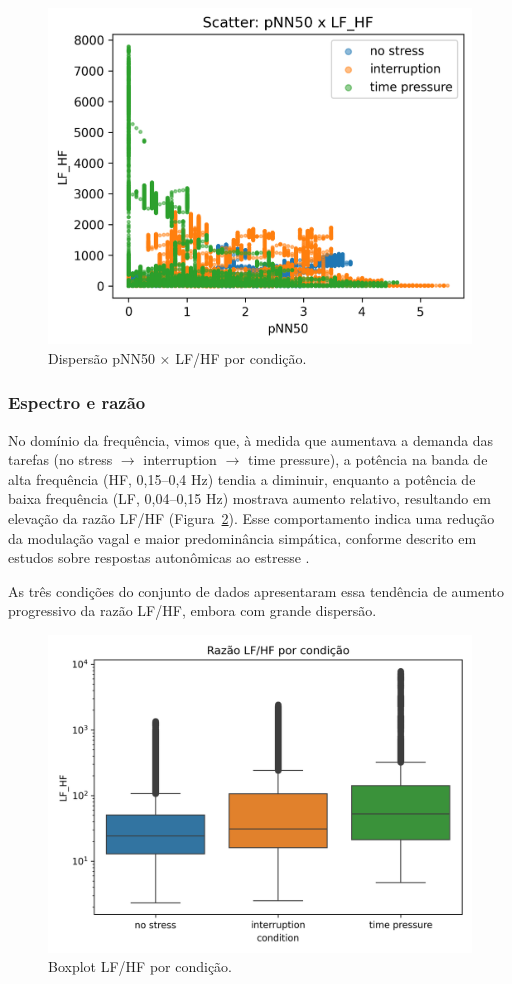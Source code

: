 \documentclass[conference]{IEEEtran}
\begin{document}
\begin{figure}[H]
    \centering
    \includegraphics[width=0.8\linewidth]{../../../images/Anderson/Scatter_Condicional/Scatter pNN50 x LF_HF.png}
    \caption{Dispersão pNN50 × LF/HF por condição.}
    \label{fig:pnn50_X_LFHF}
\end{figure}

\subsubsection{Espectro e razão}

No domínio da frequência, vimos que, à medida que aumentava a demanda das tarefas (no stress $\rightarrow$ interruption $\rightarrow$ time pressure), a potência na banda de alta frequência (HF, 0,15–0,4 Hz) tendia a diminuir, enquanto a potência de baixa frequência (LF, 0,04–0,15 Hz) mostrava aumento relativo, resultando em elevação da razão LF/HF (Figura~\ref{fig:lfhf_box}). Esse comportamento indica uma redução da modulação vagal e maior predominância simpática, conforme descrito em estudos sobre respostas autonômicas ao estresse \cite{R1}.

As três condições do conjunto de dados apresentaram essa tendência de aumento progressivo da razão LF/HF, embora com grande dispersão. 

\begin{figure}[H]
    \centering
    \includegraphics[width=0.8\linewidth]{../../../images/Anderson/box_lf_hf_condition.png}
    \caption{Boxplot LF/HF por condição.}
    \label{fig:lfhf_box}
\end{figure}
\end{document}
